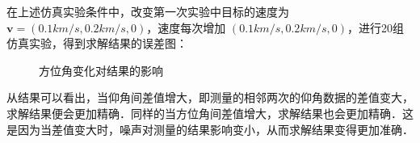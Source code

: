 在上述仿真实验条件中，改变第一次实验中目标的速度为 $\bm{v} = (0.1km/s,0.2km/s,0)$，速度每次增加 $(0.1km/s,0.2km/s,0)$，进行20组仿真实验，得到求解结果的误差图：
\begin{figure}[htbp]
	\centering

	\caption{方位角变化对结果的影响}
\end{figure}

从结果可以看出，当仰角间差值增大，即测量的相邻两次的仰角数据的差值变大，求解结果便会更加精确．同样的当方位角间差值增大，求解结果也会更加精确．这是因为当差值变大时，噪声对测量的结果影响变小，从而求解结果变得更加准确．
